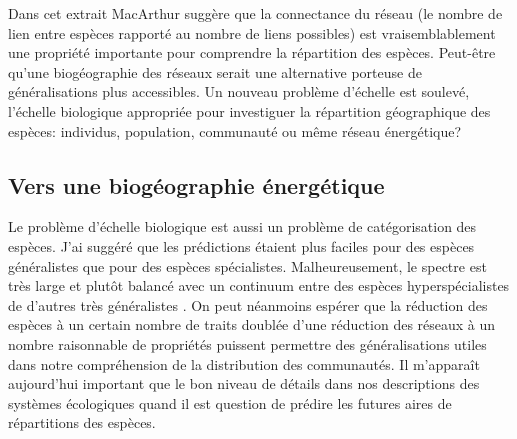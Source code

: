 Dans cet extrait MacArthur suggère que la connectance du réseau (le
nombre de lien entre espèces rapporté au nombre de liens possibles) est
vraisemblablement une propriété importante pour comprendre la
répartition des espèces. Peut-être qu'une biogéographie des réseaux
serait une alternative porteuse de généralisations plus accessibles. Un
nouveau problème d'échelle est soulevé, l'échelle biologique appropriée
pour investiguer la répartition géographique des espèces: individus,
population, communauté ou même réseau énergétique?

\subsection*{Vers une biogéographie
énergétique}\label{vers-une-bioguxe9ographie-uxe9nerguxe9tique}

Le problème d'échelle biologique est aussi un problème de catégorisation
des espèces. J'ai suggéré que les prédictions étaient plus faciles pour
des espèces généralistes que pour des espèces spécialistes.
Malheureusement, le spectre est très large et plutôt balancé avec un
continuum entre des espèces hyperspécialistes de d'autres très
généralistes \citep{Poisot2015c}. On peut néanmoins espérer que la
réduction des espèces à un certain nombre de traits
\citep{McGill2006, Poisot2015} doublée d'une réduction des réseaux à un
nombre raisonnable de propriétés puissent permettre des généralisations
utiles dans notre compréhension de la distribution des communautés. Il
m'apparaît aujourd'hui important que le bon niveau de détails dans nos
descriptions des systèmes écologiques quand il est question de prédire
les futures aires de répartitions des espèces.

